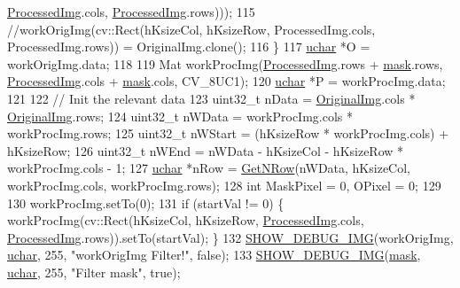 \begin{DoxyCode}
      \hyperlink{class_vision_1_1_image_processing_aa7d65742882cd1b2a1e4e9cb68809211}{ProcessedImg}.cols, \hyperlink{class_vision_1_1_image_processing_aa7d65742882cd1b2a1e4e9cb68809211}{ProcessedImg}.rows)));
115             \textcolor{comment}{//workOrigImg(cv::Rect(hKsizeCol, hKsizeRow, ProcessedImg.cols, ProcessedImg.rows)) =
       OriginalImg.clone();}
116         \}
117         \hyperlink{_soil_math_types_8h_a65f85814a8290f9797005d3b28e7e5fc}{uchar} *O = workOrigImg.data;
118 
119         Mat workProcImg(\hyperlink{class_vision_1_1_image_processing_aa7d65742882cd1b2a1e4e9cb68809211}{ProcessedImg}.rows + \hyperlink{_gen_blob_8m_a5d76cc2129e79ba1941d2cc2f53b9e8e}{mask}.rows, 
      \hyperlink{class_vision_1_1_image_processing_aa7d65742882cd1b2a1e4e9cb68809211}{ProcessedImg}.cols + \hyperlink{_gen_blob_8m_a5d76cc2129e79ba1941d2cc2f53b9e8e}{mask}.cols, CV\_8UC1);
120         \hyperlink{_soil_math_types_8h_a65f85814a8290f9797005d3b28e7e5fc}{uchar} *P = workProcImg.data;
121 
122         \textcolor{comment}{// Init the relevant data}
123         uint32\_t nData = \hyperlink{class_vision_1_1_image_processing_a77c370dab270158a4e9c634e2d3f48e7}{OriginalImg}.cols * \hyperlink{class_vision_1_1_image_processing_a77c370dab270158a4e9c634e2d3f48e7}{OriginalImg}.rows;
124         uint32\_t nWData = workProcImg.cols * workProcImg.rows;
125         uint32\_t nWStart = (hKsizeRow * workProcImg.cols) + hKsizeRow;
126         uint32\_t nWEnd = nWData - hKsizeCol - hKsizeRow * workProcImg.cols - 1;
127         \hyperlink{_soil_math_types_8h_a65f85814a8290f9797005d3b28e7e5fc}{uchar} *nRow = \hyperlink{class_vision_1_1_image_processing_a56e17515a15eb7d246985e550fc89610}{GetNRow}(nWData, hKsizeCol, workProcImg.cols, workProcImg.rows);
128         \textcolor{keywordtype}{int} MaskPixel = 0, OPixel = 0;
129 
130         workProcImg.setTo(0);
131         \textcolor{keywordflow}{if} (startVal != 0) \{ workProcImg(cv::Rect(hKsizeCol, hKsizeRow, 
      \hyperlink{class_vision_1_1_image_processing_aa7d65742882cd1b2a1e4e9cb68809211}{ProcessedImg}.cols, \hyperlink{class_vision_1_1_image_processing_aa7d65742882cd1b2a1e4e9cb68809211}{ProcessedImg}.rows)).setTo(startVal); \}
132         \hyperlink{_vision_debug_8h_aae864fa4f990213a4184a209ff236202}{SHOW\_DEBUG\_IMG}(workOrigImg, \hyperlink{_soil_math_types_8h_a65f85814a8290f9797005d3b28e7e5fc}{uchar}, 255, \textcolor{stringliteral}{"workOrigImg Filter!"}, \textcolor{keyword}{false});
133         \hyperlink{_vision_debug_8h_aae864fa4f990213a4184a209ff236202}{SHOW\_DEBUG\_IMG}(\hyperlink{_gen_blob_8m_a5d76cc2129e79ba1941d2cc2f53b9e8e}{mask}, \hyperlink{_soil_math_types_8h_a65f85814a8290f9797005d3b28e7e5fc}{uchar}, 255, \textcolor{stringliteral}{"Filter mask"}, \textcolor{keyword}{true});

\end{DoxyCode}

